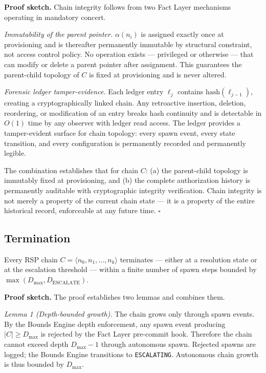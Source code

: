 \medskip\noindent\textbf{Proof sketch.} Chain integrity follows from two Fact Layer mechanisms operating in mandatory concert.

\medskip\noindent\textit{Immutability of the parent pointer.} $\alpha(n_i)$ is assigned exactly once at provisioning and is thereafter permanently immutable by structural constraint, not access control policy. No operation exists --- privileged or otherwise --- that can modify or delete a parent pointer after assignment. This guarantees the parent-child topology of $C$ is fixed at provisioning and is never altered.

\medskip\noindent\textit{Forensic ledger tamper-evidence.} Each ledger entry $\ell_j$ contains $\text{hash}(\ell_{j-1})$, creating a cryptographically linked chain. Any retroactive insertion, deletion, reordering, or modification of an entry breaks hash continuity and is detectable in $O(1)$ time by any observer with ledger read access. The ledger provides a tamper-evident surface for chain topology: every spawn event, every state transition, and every configuration is permanently recorded and permanently legible.

The combination establishes that for chain $C$: (a) the parent-child topology is immutably fixed at provisioning, and (b) the complete authorization history is permanently auditable with cryptographic integrity verification. Chain integrity is not merely a property of the current chain state --- it is a property of the entire historical record, enforceable at any future time. $\square$

\subsection{Termination}
\label{sec:rs-termination}

\begin{thrm}[Termination]
\label{thrm:termination}
Every RSP chain $C = \langle n_0, n_1, \ldots, n_k \rangle$ terminates --- either at a resolution state or at the escalation threshold --- within a finite number of spawn steps bounded by $\max(D_{\max}, D_{\mathrm{ESCALATE}})$.
\end{thrm}

\medskip\noindent\textbf{Proof sketch.} The proof establishes two lemmas and combines them.

\medskip\noindent\textit{Lemma 1 (Depth-bounded growth).} The chain grows only through spawn events. By the Bounds Engine depth enforcement, any spawn event producing $|C| \geq D_{\max}$ is rejected by the Fact Layer pre-commit hook. Therefore the chain cannot exceed depth $D_{\max} - 1$ through autonomous spawn. Rejected spawns are logged; the Bounds Engine transitions to \texttt{ESCALATING}. Autonomous chain growth is thus bounded by $D_{\max}$.

